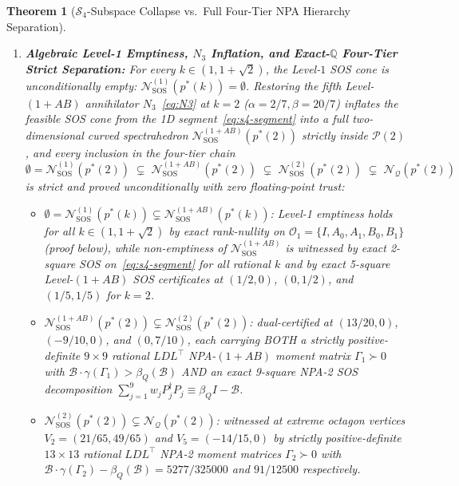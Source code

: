 \documentclass[11pt,a4paper]{article}
\newtheorem{theorem}{Theorem}[section]
\newcommand{\QQ}{\mathbb{Q}}
\newcommand{\calN}{\mathcal{N}_{\mathcal{Q}}}
\newcommand{\calP}{\mathcal{P}}
\newcommand{\calB}{\mathcal{B}}
\newcommand{\calS}{\mathcal{S}}
\begin{document}
\begin{theorem}[$\calS_4$-Subspace Collapse vs.\ Full Four-Tier NPA Hierarchy Separation]
\begin{enumerate}[leftmargin=1.8em,itemsep=3pt]
\begin{equation}
  \end{equation}
  certified by an exact rank-$2$ rational SOS
  \begin{equation}
    \frac{8}{\beta} I - \calB_{\mathrm{Bob}}(\alpha) = \frac{\beta}{4}\!\left(N_1 + \frac{4\alpha}{\beta^2} N_5\right)^2 + \frac{8 - 2\alpha^2}{\beta^3}\, N_5^2.
    \label{eq:bob-2sq}
  \end{equation}
  \item \textbf{Algebraic Level-1 Emptiness, $N_3$ Inflation, and Exact-$\QQ$ Four-Tier Strict Separation:}
  For \emph{every} $k \in (1, 1+\sqrt{2})$, the Level-$1$ SOS cone is unconditionally empty: $\mathcal{N}_{\mathrm{SOS}}^{(1)}(p^*(k)) = \emptyset$. Restoring the fifth Level-$(1+AB)$ annihilator $N_3$~\eqref{eq:N3} at $k = 2$ ($\alpha = 2/7, \beta = 20/7$) inflates the feasible SOS cone from the 1D segment~\eqref{eq:s4-segment} into a full two-dimensional curved spectrahedron $\mathcal{N}_{\mathrm{SOS}}^{(1+AB)}(p^*(2))$ strictly inside $\calP(2)$, and every inclusion in the four-tier chain
  \begin{equation}
    \emptyset = \mathcal{N}_{\mathrm{SOS}}^{(1)}(p^*(2))
    \;\subsetneq\; \mathcal{N}_{\mathrm{SOS}}^{(1+AB)}(p^*(2))
    \;\subsetneq\; \mathcal{N}_{\mathrm{SOS}}^{(2)}(p^*(2))
    \;\subsetneq\; \calN(p^*(2))
    \label{eq:four-tier}
  \end{equation}
  is strict and proved unconditionally with zero floating-point trust:
  \begin{itemize}[leftmargin=1.5em,itemsep=1pt]
    \item $\emptyset = \mathcal{N}_{\mathrm{SOS}}^{(1)}(p^*(k)) \subsetneq \mathcal{N}_{\mathrm{SOS}}^{(1+AB)}(p^*(k))$: Level-1 emptiness holds for all $k \in (1, 1+\sqrt{2})$ by exact rank-nullity on $\mathcal{O}_1 = \{I, A_0, A_1, B_0, B_1\}$ (proof below), while non-emptiness of $\mathcal{N}_{\mathrm{SOS}}^{(1+AB)}$ is witnessed by exact 2-square SOS on~\eqref{eq:s4-segment} for all rational $k$ and by exact 5-square Level-$(1+AB)$ SOS certificates at $(1/2, 0)$, $(0, 1/2)$, and $(1/5, 1/5)$ for $k=2$.
    \item $\mathcal{N}_{\mathrm{SOS}}^{(1+AB)}(p^*(2)) \subsetneq \mathcal{N}_{\mathrm{SOS}}^{(2)}(p^*(2))$: dual-certified at $(13/20, 0)$, $(-9/10, 0)$, and $(0, 7/10)$, each carrying BOTH a strictly positive-definite $9\times 9$ rational $LDL^\top$ NPA-$(1+AB)$ moment matrix $\Gamma_1 \succ 0$ with $\calB\cdot\gamma(\Gamma_1) > \beta_Q(\calB)$ AND an exact 9-square NPA-2 SOS decomposition $\sum_{j=1}^9 w_j P_j^\dagger P_j \equiv \beta_Q I - \calB$.
    \item $\mathcal{N}_{\mathrm{SOS}}^{(2)}(p^*(2)) \subsetneq \calN(p^*(2))$: witnessed at extreme octagon vertices $V_2 = (21/65, 49/65)$ and $V_5 = (-14/15, 0)$ by strictly positive-definite $13\times 13$ rational $LDL^\top$ NPA-2 moment matrices $\Gamma_2 \succ 0$ with $\calB\cdot\gamma(\Gamma_2) - \beta_Q(\calB) = 5277/325000$ and $91/12500$ respectively.
  \end{itemize}
\end{enumerate}
\end{theorem}
\end{document}
